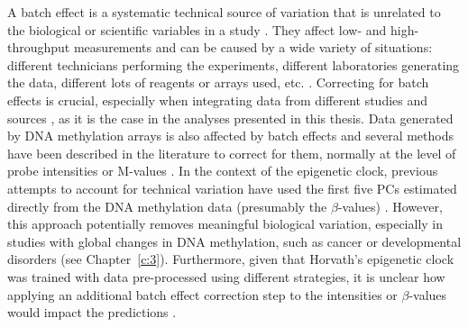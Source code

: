 \bigskip

A batch effect is a systematic technical source of variation that is unrelated to the biological or scientific variables in a study \citep{Leek2010}. They affect low- and high-throughput measurements and can be caused by a wide variety of situations: different technicians performing the experiments, different laboratories generating the data, different lots of reagents or arrays used, etc. \citep{Leek2010}. Correcting for batch effects is crucial, especially when integrating data from different studies and sources \citep{Maksimovic2015}, as it is the case in the analyses presented in this thesis. Data generated by DNA methylation arrays is also affected by batch effects and several methods have been described in the literature to correct for them, normally at the level of probe intensities \citep{Fortin2014} or M-values \citep{Maksimovic2015,Price2018}. In the context of the epigenetic clock, previous attempts to account for technical variation have used the first five \acrshort{PC}s estimated directly from the DNA methylation data (presumably the $\beta$-values) \citep{Horvath2016a}. However, this approach potentially removes meaningful biological variation, especially in studies with global changes in DNA methylation, such as cancer \citep{Fortin2014} or developmental disorders (see Chapter~\ref{c:3}). Furthermore, given that Horvath's epigenetic clock was trained with data pre-processed using different strategies, it is unclear how applying an additional batch effect correction step to the intensities or $\beta$-values would impact the predictions \citep{Horvath2013a}.

\bigskip

